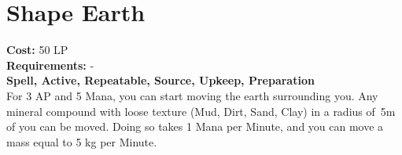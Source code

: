 \section{Shape Earth}\label{spell:shapeEarth}
\textbf{Cost:} 50 LP\\
\textbf{Requirements:} -\\
\textbf{Spell, Active, Repeatable, Source, Upkeep, Preparation}\\
For 3 AP and 5 Mana, you can start moving the earth surrounding you.
Any mineral compound with loose texture (Mud, Dirt, Sand, Clay) in a radius of~5m of you can be moved.
Doing so takes 1 Mana per Minute, and you can move a mass equal to 5 kg per Minute.